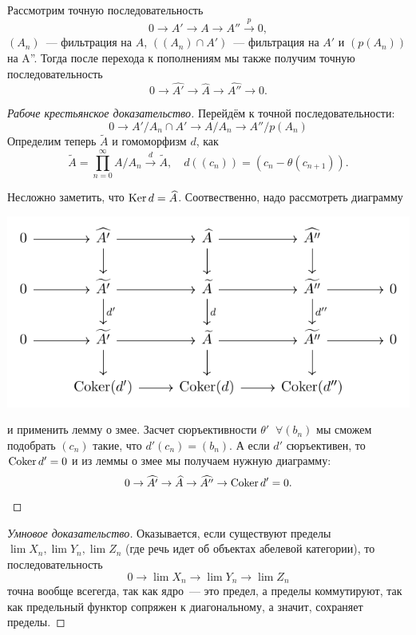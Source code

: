 	\begin{lemma} 
		Рассмотрим точную последовательность 
		\[
			0 \to A' \to A \to A'' \xrightarrow{p} 0, 
		\]
		$(A_n)$~--- фильтрация на $A$, $((A_n) \cap A')$~--- фильтрация на $A'$ и $(p(A_n))$ на A''. Тогда после перехода к пополнениям мы также получим точную последовательность 
		\[
			0 \to \widehat{A'} \to \widehat{A} \to \widehat{A''} \to 0.
		\]
	\end{lemma}
	\begin{proof}[Рабоче крестьянское доказательство] 
		Перейдём к точной последовательности: 
		\[
			0 \to A'/A_n \cap A' \to A/A_n \to A''/p(A_n)
		\]
		Определим теперь $\widetilde{A}$ и гомоморфизм $d$, как
		\[ 
			\widetilde{A} = \prod_{n = 0}^{\infty} A/A_n \xrightarrow{d} \widetilde{A}, \quad d((c_n)) = (c_n - \theta(c_{n + 1})). 
		\]

		Несложно заметить, что $\operatorname{Ker}{d} = \widehat{A}$. Соотвественно, надо рассмотреть диаграмму 
		\begin{center}
			\includegraphics{lectures/3/commutative diagramms/snake_2.pdf}
		\end{center}

		и применить лемму о змее. Засчет сюръективности $\theta'$ $\ \forall (b_n)$ мы сможем подобрать $(c_n)$ такие, что $d'(c_n) = (b_n)$. А если $d'$ сюръективен, то $\operatorname{Coker}{d'} = 0$ и из леммы о змее мы получаем нужную  диаграмму:
		\[
			0 \to \widehat{A'} \to \widehat{A} \to \widehat{A''} \to \operatorname{Coker}{d'} = 0.
		\]

	\end{proof}
	\begin{proof}[Умновое доказательство]
		Оказывается, если существуют пределы $\lim{X_n}, \lim{Y_n}, \lim{Z_n}$ (где речь идет об объектах абелевой категории), то последовательность 
		\[
			0 \to \lim{X_n} \to \lim{Y_n} \to \lim{Z_n} 
		\]
		точна вообще всегегда, так как ядро~--- это предел, а пределы коммутируют, так как предельный функтор сопряжен к диагональному, а значит, сохраняет пределы. 
	\end{proof}

